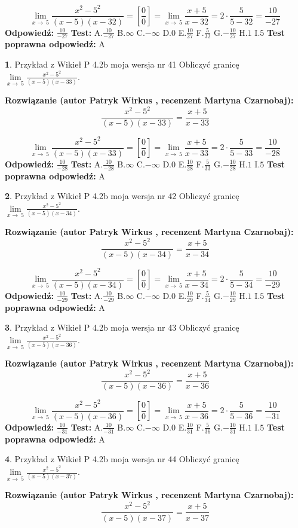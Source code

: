 \documentclass[12pt, a4paper]{article}
\theoremstyle{definition} %
\newtheorem{zad}{}
\newcommand{\zadStart}[1]{\begin{zad}#1\newline}
\newcommand{\zadStop}{\end{zad}}
\newcommand{\rozwStart}[2]{\noindent \textbf{Rozwiązanie (autor #1 , recenzent #2): }\newline}
\newcommand{\rozwStop}{\newline}
\newcommand{\odpStart}{\noindent \textbf{Odpowiedź:}\newline}
\newcommand{\odpStop}{\newline}
\newcommand{\testStart}{\noindent \textbf{Test:}\newline}
\newcommand{\testStop}{\newline}
\newcommand{\kluczStart}{\noindent \textbf{Test poprawna odpowiedź:}\newline}
\newcommand{\kluczStop}{\newline}
\begin{document}
$$\lim\limits_{x\to\ 5}\frac{x^{2}-5^{2}}{(x-5)(x-32)}=[\frac{0}{0}]=\lim\limits_{x\to\ 5}\frac{x+5}{x-32}=2 \cdot \frac{5}{5-32} = \frac{10}{-27}$$
\rozwStop
\odpStart
$\frac{10}{-27}$
\odpStop
\testStart
A.$\frac{10}{-27}$
B.$\infty$
C.$-\infty$
D.$0$
E.$\frac{10}{27}$
F.$\frac{5}{32}$
G.$-\frac{10}{27}$
H.$1$
I.$5$
\testStop
\kluczStart
A
\kluczStop



\zadStart{Przykład z Wikieł P 4.2b moja wersja nr 41}
Obliczyć granicę $\lim\limits_{x\to\ 5}\frac{x^{2}-5^{2}}{(x-5)(x-33)}$.
\zadStop
\rozwStart{Patryk Wirkus}{Martyna Czarnobaj}
$$\frac{x^{2}-5^{2}}{(x-5)(x-33)}=\frac{x+5}{x-33}$$

$$\lim\limits_{x\to\ 5}\frac{x^{2}-5^{2}}{(x-5)(x-33)}=[\frac{0}{0}]=\lim\limits_{x\to\ 5}\frac{x+5}{x-33}=2 \cdot \frac{5}{5-33} = \frac{10}{-28}$$
\rozwStop
\odpStart
$\frac{10}{-28}$
\odpStop
\testStart
A.$\frac{10}{-28}$
B.$\infty$
C.$-\infty$
D.$0$
E.$\frac{10}{28}$
F.$\frac{5}{33}$
G.$-\frac{10}{28}$
H.$1$
I.$5$
\testStop
\kluczStart
A
\kluczStop



\zadStart{Przykład z Wikieł P 4.2b moja wersja nr 42}
Obliczyć granicę $\lim\limits_{x\to\ 5}\frac{x^{2}-5^{2}}{(x-5)(x-34)}$.
\zadStop
\rozwStart{Patryk Wirkus}{Martyna Czarnobaj}
$$\frac{x^{2}-5^{2}}{(x-5)(x-34)}=\frac{x+5}{x-34}$$

$$\lim\limits_{x\to\ 5}\frac{x^{2}-5^{2}}{(x-5)(x-34)}=[\frac{0}{0}]=\lim\limits_{x\to\ 5}\frac{x+5}{x-34}=2 \cdot \frac{5}{5-34} = \frac{10}{-29}$$
\rozwStop
\odpStart
$\frac{10}{-29}$
\odpStop
\testStart
A.$\frac{10}{-29}$
B.$\infty$
C.$-\infty$
D.$0$
E.$\frac{10}{29}$
F.$\frac{5}{34}$
G.$-\frac{10}{29}$
H.$1$
I.$5$
\testStop
\kluczStart
A
\kluczStop



\zadStart{Przykład z Wikieł P 4.2b moja wersja nr 43}
Obliczyć granicę $\lim\limits_{x\to\ 5}\frac{x^{2}-5^{2}}{(x-5)(x-36)}$.
\zadStop
\rozwStart{Patryk Wirkus}{Martyna Czarnobaj}
$$\frac{x^{2}-5^{2}}{(x-5)(x-36)}=\frac{x+5}{x-36}$$

$$\lim\limits_{x\to\ 5}\frac{x^{2}-5^{2}}{(x-5)(x-36)}=[\frac{0}{0}]=\lim\limits_{x\to\ 5}\frac{x+5}{x-36}=2 \cdot \frac{5}{5-36} = \frac{10}{-31}$$
\rozwStop
\odpStart
$\frac{10}{-31}$
\odpStop
\testStart
A.$\frac{10}{-31}$
B.$\infty$
C.$-\infty$
D.$0$
E.$\frac{10}{31}$
F.$\frac{5}{36}$
G.$-\frac{10}{31}$
H.$1$
I.$5$
\testStop
\kluczStart
A
\kluczStop



\zadStart{Przykład z Wikieł P 4.2b moja wersja nr 44}
Obliczyć granicę $\lim\limits_{x\to\ 5}\frac{x^{2}-5^{2}}{(x-5)(x-37)}$.
\zadStop
\rozwStart{Patryk Wirkus}{Martyna Czarnobaj}
$$\frac{x^{2}-5^{2}}{(x-5)(x-37)}=\frac{x+5}{x-37}$$
\end{document}
